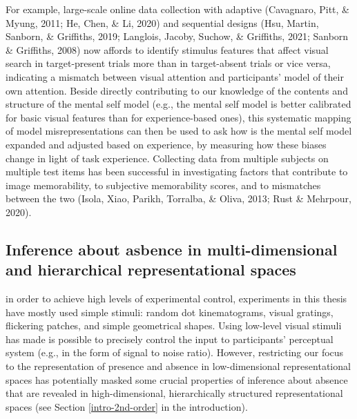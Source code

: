 \documentclass[12pt,twoside]{reedthesis}
\begin{document}
For example, large-scale online data collection with adaptive (Cavagnaro, Pitt, \& Myung, 2011; He, Chen, \& Li, 2020) and sequential designs (Hsu, Martin, Sanborn, \& Griffiths, 2019; Langlois, Jacoby, Suchow, \& Griffiths, 2021; Sanborn \& Griffiths, 2008) now affords to identify stimulus features that affect visual search in target-present trials more than in target-absent trials or vice versa, indicating a mismatch between visual attention and participants' model of their own attention. Beside directly contributing to our knowledge of the contents and structure of the mental self model (e.g., the mental self model is better calibrated for basic visual features than for experience-based ones), this systematic mapping of model misrepresentations can then be used to ask how is the mental self model expanded and adjusted based on experience, by measuring how these biases change in light of task experience. Collecting data from multiple subjects on multiple test items has been successful in investigating factors that contribute to image memorability, to subjective memorability scores, and to mismatches between the two (Isola, Xiao, Parikh, Torralba, \& Oliva, 2013; Rust \& Mehrpour, 2020).

\hypertarget{inference-about-asbence-in-multi-dimensional-and-hierarchical-representational-spaces}{%
\subsection*{Inference about asbence in multi-dimensional and hierarchical representational spaces}\label{inference-about-asbence-in-multi-dimensional-and-hierarchical-representational-spaces}}

in order to achieve high levels of experimental control, experiments in this thesis have mostly used simple stimuli: random dot kinematograms, visual gratings, flickering patches, and simple geometrical shapes. Using low-level visual stimuli has made is possible to precisely control the input to participants' perceptual system (e.g., in the form of signal to noise ratio). However, restricting our focus to the representation of presence and absence in low-dimensional representational spaces has potentially masked some crucial properties of inference about absence that are revealed in high-dimensional, hierarchically structured representational spaces (see Section \ref{intro-2nd-order} in the introduction).
\end{document}
